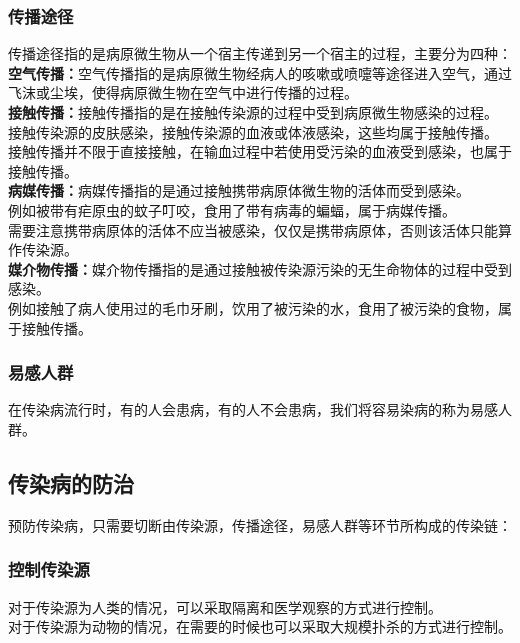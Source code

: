 \documentclass[UTF8]{ctexart}
\begin{document}
\newpage

\subsubsection{传播途径}
    传播途径指的是病原微生物从一个宿主传递到另一个宿主的过程，主要分为四种：\\[6mm]
    \textbf{空气传播：}空气传播指的是病原微生物经病人的咳嗽或喷嚏等途径进入空气，通过飞沫或尘埃，使得病原微生物在空气中进行传播的过程。\\[6mm]
    \textbf{接触传播：}接触传播指的是在接触传染源的过程中受到病原微生物感染的过程。\\[3mm]
    接触传染源的皮肤感染，接触传染源的血液或体液感染，这些均属于接触传播。\\[3mm]
    接触传播并不限于直接接触，在输血过程中若使用受污染的血液受到感染，也属于接触传播。\\[6mm]
    \textbf{病媒传播：}病媒传播指的是通过接触携带病原体微生物的活体而受到感染。\\[3mm]
    例如被带有疟原虫的蚊子叮咬，食用了带有病毒的蝙蝠，属于病媒传播。\\[3mm]
    需要注意携带病原体的活体不应当被感染，仅仅是携带病原体，否则该活体只能算作传染源。\\[6mm]
    \textbf{媒介物传播：}媒介物传播指的是通过接触被传染源污染的无生命物体的过程中受到感染。\\[3mm]
    例如接触了病人使用过的毛巾牙刷，饮用了被污染的水，食用了被污染的食物，属于接触传播。\vspace{3pt}

\subsubsection{易感人群}
    在传染病流行时，有的人会患病，有的人不会患病，我们将容易染病的称为易感人群。\\[1mm]

\subsection{传染病的防治}
    预防传染病，只需要切断由传染源，传播途径，易感人群等环节所构成的传染链：

\subsubsection{控制传染源}
    对于传染源为人类的情况，可以采取隔离和医学观察的方式进行控制。\\[3mm]
    对于传染源为动物的情况，在需要的时候也可以采取大规模扑杀的方式进行控制。
\end{document}
